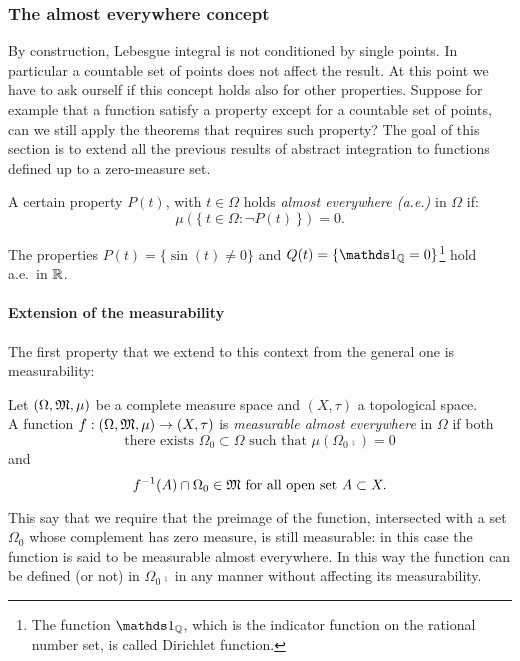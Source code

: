 \subsubsection{The almost everywhere concept}
By construction, Lebesgue integral is not conditioned by single points. In particular a countable set of points does not affect the result. At this point we have to ask ourself if this concept holds also for other properties. Suppose for example that a function satisfy a property except for a countable set of points, can we still apply the theorems that requires such property? The goal of this section is to extend all the previous results of abstract integration to functions defined up to a zero-measure set.

\begin{defn}
	A certain property $P(t)$, with $t\in \Omega$ holds \emph{almost everywhere (a.e.)} in $\Omega$ if:
	$$
		\mu(\{ \ 
			t\in \Omega: \neg P(t)
		\ \})
		=
		0
	.
	$$
\end{defn}

\begin{exam}
	The properties $P(t) = \{\sin(t) \neq 0\}$ and $Q(t) = \{\Ind_\QQ=0\}$\footnote{The function $\Ind_\QQ$, which is the indicator function on the rational number set, is called Dirichlet function.} hold a.e.\ in $\mathbb R$.
	
\end{exam}


\paragraph{Extension of the measurability} The first property that we extend to this context from the general one is measurability:
\begin{defn}
	Let $(\Omega, \mathfrak M, \mu)$ be a complete measure space and $(X,\tau)$ a topological space.\\
	A function $f:(\Omega, \mathfrak M, \mu) \to (X,\tau)$ is \emph{measurable almost everywhere} in $\Omega$ if both
	$$\text{there exists } \Omega_0 \subset \Omega 
	\text{ such that } \mu(\Omega_0\comp)=0$$
	and
	$$f^{-1}(A) \cap \Omega_0 \in \mathfrak M 
	\text{ for all open set } A \subset X.$$
\end{defn}

This say that we require that the preimage of the function, intersected with a set $\Omega_0$ whose complement has zero measure, is still measurable: in this case the function is said to be measurable almost everywhere. In this way the function can be defined (or not) in $\Omega_0\comp$ in any manner without affecting its measurability.

